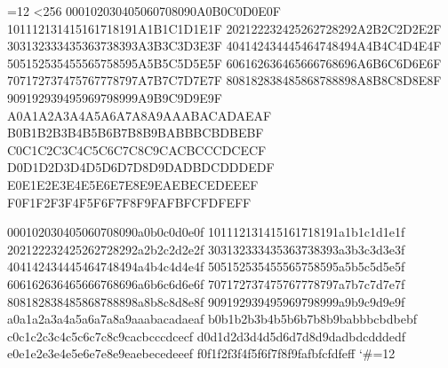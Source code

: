 \makeatletter
\begingroup
  \gdef\AllBytes{}%
  =12 %
  \@whilenum\count@<256 \do{%
    \lccode0=\count@
    \ifnum\count@=32 %
      \xdef\AllBytes{\AllBytes\space}%
    \else
      \lowercase{%
        \xdef\AllBytes{\AllBytes^^@}%
      }%
    \fi
    \advance\count@ by 1 %
  }%
\endgroup
\newcommand*{\AllBytesHex}{%
  000102030405060708090A0B0C0D0E0F%
  101112131415161718191A1B1C1D1E1F%
  202122232425262728292A2B2C2D2E2F%
  303132333435363738393A3B3C3D3E3F%
  404142434445464748494A4B4C4D4E4F%
  505152535455565758595A5B5C5D5E5F%
  606162636465666768696A6B6C6D6E6F%
  707172737475767778797A7B7C7D7E7F%
  808182838485868788898A8B8C8D8E8F%
  909192939495969798999A9B9C9D9E9F%
  A0A1A2A3A4A5A6A7A8A9AAABACADAEAF%
  B0B1B2B3B4B5B6B7B8B9BABBBCBDBEBF%
  C0C1C2C3C4C5C6C7C8C9CACBCCCDCECF%
  D0D1D2D3D4D5D6D7D8D9DADBDCDDDEDF%
  E0E1E2E3E4E5E6E7E8E9EAEBECEDEEEF%
  F0F1F2F3F4F5F6F7F8F9FAFBFCFDFEFF%
}
\@onelevel@sanitize\AllBytesHex
\expandafter\lowercase\expandafter{%
  \expandafter\newcommand\expandafter*\expandafter\AllBytesHexLC
      \expandafter{\AllBytesHex}%
}
\newcommand*{\AllBytesName}{}
\begingroup
  \catcode`\#=12 %
  \xdef\AllBytesName{%
    #01#02#03#04#05#06#07#08#09#0A#0B#0C#0D#0E#0F%
    #10#11#12#13#14#15#16#17#18#19#1A#1B#1C#1D#1E#1F%
    #20!"#23$#25&'#28#29*+,-.#2F%
    0123456789:;#3C=#3E?%
    @ABCDEFGHIJKLMNO%
    PQRSTUVWXYZ#5B\@backslashchar#5D^_%
    `abcdefghijklmno%
    pqrstuvwxyz#7B|#7D\string~#7F%
    #80#81#82#83#84#85#86#87#88#89#8A#8B#8C#8D#8E#8F%
    #90#91#92#93#94#95#96#97#98#99#9A#9B#9C#9D#9E#9F%
    #A0#A1#A2#A3#A4#A5#A6#A7#A8#A9#AA#AB#AC#AD#AE#AF%
    #B0#B1#B2#B3#B4#B5#B6#B7#B8#B9#BA#BB#BC#BD#BE#BF%
    #C0#C1#C2#C3#C4#C5#C6#C7#C8#C9#CA#CB#CC#CD#CE#CF%
    #D0#D1#D2#D3#D4#D5#D6#D7#D8#D9#DA#DB#DC#DD#DE#DF%
    #E0#E1#E2#E3#E4#E5#E6#E7#E8#E9#EA#EB#EC#ED#EE#EF%
    #F0#F1#F2#F3#F4#F5#F6#F7#F8#F9#FA#FB#FC#FD#FE#FF%
  }%
\endgroup
\@onelevel@sanitize\AllBytesName

\newcommand*{\AllBytesString}{}
\begingroup
  \def\|{|}%
  \edef\%{\@percentchar}%
  \catcode`\|=0 %
  \catcode`\#=12 %
  \catcode`\~=12 %
  \catcode`\\=12 %
  |xdef|AllBytesString{%
    \000\001\002\003\004\005\006\007\010\011\012\013\014\015\016\017%
    \020\021\022\023\024\025\026\027\030\031\032\033\034\035\036\037%
    \040!"#$|%
    0123456789:;<=>?%
    @ABCDEFGHIJKLMNO%
    PQRSTUVWXYZ[\\]^_%
    `abcdefghijklmno%
    pqrstuvwxyz{||}~\177%
    \200\201\202\203\204\205\206\207\210\211\212\213\214\215\216\217%
    \220\221\222\223\224\225\226\227\230\231\232\233\234\235\236\237%
    \240\241\242\243\244\245\246\247\250\251\252\253\254\255\256\257%
    \260\261\262\263\264\265\266\267\270\271\272\273\274\275\276\277%
    \300\301\302\303\304\305\306\307\310\311\312\313\314\315\316\317%
    \320\321\322\323\324\325\326\327\330\331\332\333\334\335\336\337%
    \340\341\342\343\344\345\346\347\350\351\352\353\354\355\356\357%
    \360\361\362\363\364\365\366\367\370\371\372\373\374\375\376\377%
  }%
|endgroup
\@onelevel@sanitize\AllBytesString


